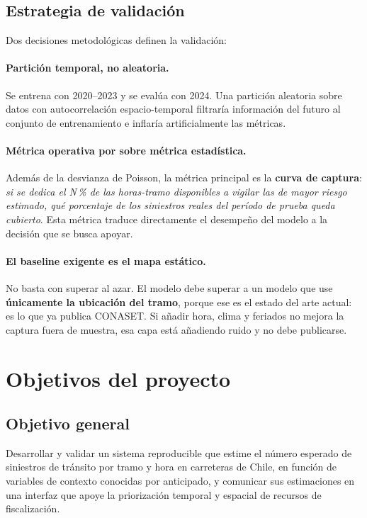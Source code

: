 \documentclass[11pt,a4paper]{article}
\begin{document}
\subsection{Estrategia de validación}

Dos decisiones metodológicas definen la validación:

\paragraph{Partición temporal, no aleatoria.} Se entrena con 2020--2023 y se
evalúa con 2024. Una partición aleatoria sobre datos con autocorrelación
espacio-temporal filtraría información del futuro al conjunto de entrenamiento e
inflaría artificialmente las métricas.

\paragraph{Métrica operativa por sobre métrica estadística.} Además de la
desvianza de Poisson, la métrica principal es la \textbf{curva de captura}:
\emph{si se dedica el N\,\% de las horas-tramo disponibles a vigilar las de
mayor riesgo estimado, qué porcentaje de los siniestros reales del período de
prueba queda cubierto}. Esta métrica traduce directamente el desempeño del
modelo a la decisión que se busca apoyar.

\paragraph{El baseline exigente es el mapa estático.} No basta con superar al
azar. El modelo debe superar a un modelo que use \textbf{únicamente la ubicación
del tramo}, porque ese es el estado del arte actual: es lo que ya publica
CONASET. Si añadir hora, clima y feriados no mejora la captura fuera de muestra,
esa capa está añadiendo ruido y no debe publicarse.

\section{Objetivos del proyecto}

\subsection{Objetivo general}

Desarrollar y validar un sistema reproducible que estime el número esperado de
siniestros de tránsito por tramo y hora en carreteras de Chile, en función de
variables de contexto conocidas por anticipado, y comunicar sus estimaciones en
una interfaz que apoye la priorización temporal y espacial de recursos de
fiscalización.
\end{document}
